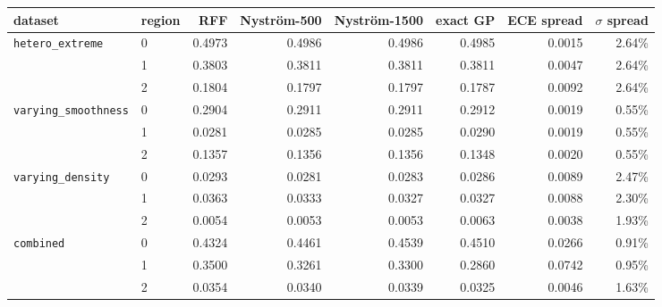 \begin{tabular}{llrrrrrr}
\toprule
dataset & region & RFF & Nystr\"om-500 & Nystr\"om-1500 & exact GP & ECE spread & $\sigma$ spread \\
\midrule
\texttt{hetero\_extreme} & 0 & 0.4973 & 0.4986 & 0.4986 & 0.4985 & 0.0015 & 2.64\% \\
 & 1 & 0.3803 & 0.3811 & 0.3811 & 0.3811 & 0.0047 & 2.64\% \\
 & 2 & 0.1804 & 0.1797 & 0.1797 & 0.1787 & 0.0092 & 2.64\% \\
\midrule
\texttt{varying\_smoothness} & 0 & 0.2904 & 0.2911 & 0.2911 & 0.2912 & 0.0019 & 0.55\% \\
 & 1 & 0.0281 & 0.0285 & 0.0285 & 0.0290 & 0.0019 & 0.55\% \\
 & 2 & 0.1357 & 0.1356 & 0.1356 & 0.1348 & 0.0020 & 0.55\% \\
\midrule
\texttt{varying\_density} & 0 & 0.0293 & 0.0281 & 0.0283 & 0.0286 & 0.0089 & 2.47\% \\
 & 1 & 0.0363 & 0.0333 & 0.0327 & 0.0327 & 0.0088 & 2.30\% \\
 & 2 & 0.0054 & 0.0053 & 0.0053 & 0.0063 & 0.0038 & 1.93\% \\
\midrule
\texttt{combined} & 0 & 0.4324 & 0.4461 & 0.4539 & 0.4510 & 0.0266 & 0.91\% \\
 & 1 & 0.3500 & 0.3261 & 0.3300 & 0.2860 & 0.0742 & 0.95\% \\
 & 2 & 0.0354 & 0.0340 & 0.0339 & 0.0325 & 0.0046 & 1.63\% \\
\bottomrule
\end{tabular}
